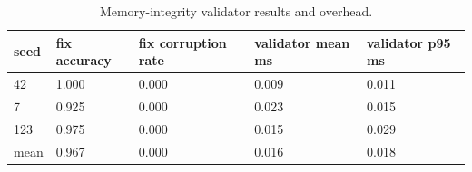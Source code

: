 \begin{table}[t]
\centering
\caption{Memory-integrity validator results and overhead.}
\label{tab:validator}
\begin{tabular}{lllll}
\toprule
seed & fix accuracy & fix corruption rate & validator mean ms & validator p95 ms \\
\midrule
42 & 1.000 & 0.000 & 0.009 & 0.011 \\
7 & 0.925 & 0.000 & 0.023 & 0.015 \\
123 & 0.975 & 0.000 & 0.015 & 0.029 \\
mean & 0.967 & 0.000 & 0.016 & 0.018 \\
\bottomrule
\end{tabular}
\end{table}
